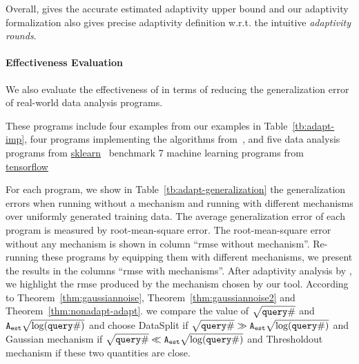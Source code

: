 Overall, {\THESYSTEM} gives the accurate estimated
adaptivity upper bound and our adaptivity formalization also gives precise adaptivity definition w.r.t. the intuitive \emph{adaptivity rounds}.


\paragraph{Effectiveness Evaluation}

We also evaluate the effectiveness of {\THESYSTEM} in terms of reducing the generalization error of real-world data analysis programs.

These programs include 
four examples from our examples in Table~\ref{tb:adapt-imp},
four programs implementing the algorithms from~\cite{Jamieson2015TheAO},
and five data analysis programs 
from \hyperlink{https://github.com/scikit-learn/scikit-learn/tree/main/examples}{sklearn}~\cite{SklearnBenchmark} benchmark
7 machine learning programs
from \hyperlink{https://github.com/tensorflow/tensorflow/tree/master/tensorflow/examples}{tensorflow}~\cite{TensorflowBenchmark}

For each program, we show in Table~\ref{tb:adapt-generalization} the generalization errors when running without a mechanism
and running with different mechanisms over uniformly generated training data.
The average generalization error of each program is measured by root-mean-square error.
The root-mean-square error without any mechanism is shown in column ``rmse without mechanism''.
Re-running these programs by equipping them with different mechanisms, we present the results
in the columns ``rmse with mechanisms''.
After adaptivity analysis by {\THESYSTEM}, we highlight the rmse produced by the mechanism chosen by our tool.
According to Theorem~\ref{thm:gaussiannoise}, Theorem~\ref{thm:gaussiannoise2} and Theorem~\ref{thm:nonadapt-adapt}.
we compare the value of $\sqrt{{\tt query} \#}$ and ${\mathtt{A_{est}}}\sqrt{\log({\tt query} \#)}$
and choose DataSplit if $\sqrt{{\tt query} \#} \gg {\ensuremath{\mathtt{A_{est}}}}\sqrt{\log({\tt query} \#)}$ and Gaussian mechanism if
$\sqrt{{\tt query} \#} \ll {\ensuremath{\mathtt{A_{est}}}}\sqrt{\log({\tt query} \#)}$ and Thresholdout mechanism if these two quantities are close.

